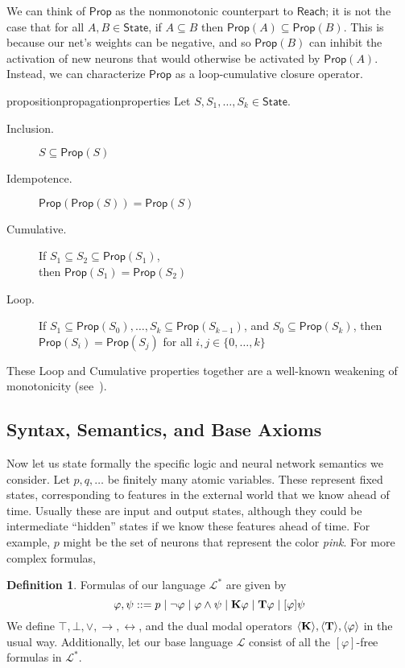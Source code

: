 \documentclass[letterpaper]{article}
\theoremstyle{definition}
\newtheorem{definition}{Definition}
\newcommand{\State}{\mathsf{State}}
\newcommand{\lang}{\mathcal{L}}
\newcommand{\uplang}{\mathcal{L}^\ast}
\newcommand{\set}[1]{\{ #1 \}}
\newcommand{\Prop}{\mathsf{Prop}}
\newcommand{\Reach}{\mathsf{Reach}}
\newcommand{\Typ}[1]{\textrm{\textup{\textbf{T}}} #1}
\newcommand{\Know}[1]{\textrm{\textup{\textbf{K}}} #1}
\newcommand{\Hebbop}[1]{[#1]}
\newcommand{\diaTyp}[1]{\langle \textrm{\textup{\textbf{T}}} \rangle #1}
\newcommand{\diaKnow}[1]{\langle \textrm{\textup{\textbf{K}}} \rangle #1}
\newcommand{\diaHebbop}[1]{\langle #1\rangle}
\begin{document}
We can think of $\Prop$ as the nonmonotonic counterpart to $\Reach$; it is not the case that for all $A, B \in \State$, if $A \subseteq B$ then $\Prop(A) \subseteq \Prop(B)$.  This is because our net's weights can be negative, and so $\Prop(B)$ can inhibit the activation of new neurons that would otherwise be activated by $\Prop(A)$.  Instead, we can characterize $\Prop$ as a loop-cumulative closure operator.
\begin{restatable}{proposition}{propagationproperties}\cite{leitgeb2001nonmonotonic}\label{propagation-properties}
    Let $S, S_1, \ldots, S_k \in \State$.
    \begin{description}
        \item[Inclusion.] $S \subseteq \Prop(S)$
        \item[Idempotence.] $\Prop(\Prop(S)) = \Prop(S)$
        \item[Cumulative.] If $S_1 \subseteq S_2 \subseteq \Prop(S_1)$,\\ then $\Prop(S_1) = \Prop(S_2)$
        \item[Loop.] If $S_1 \subseteq \Prop(S_0), \ldots, S_k \subseteq \Prop(S_{k-1})$, and $S_0 \subseteq \Prop(S_k)$, then $\Prop(S_i) = \Prop(S_j)$ for all $i, j \in \set{0, \ldots, k}$
    \end{description}
\end{restatable}
These Loop and Cumulative properties together are a well-known weakening of monotonicity (see~\cite{kraus1990nonmonotonic}).

\subsection{Syntax, Semantics, and Base Axioms}

Now let us state formally the specific logic and neural network semantics we consider.  Let $p, q, \ldots$ be finitely many atomic variables. These represent fixed states, corresponding to features in the external world that we know ahead of time.  Usually these are input and output states, although they could be intermediate ``hidden'' states if we know these features ahead of time.  For example, $p$ might be the set of neurons that represent the color \emph{pink}.  For more complex formulas,
\begin{definition}
    Formulas of our language $\uplang$ are given by
    \[
        \varphi, \psi ::= p \mid \neg \varphi \mid \varphi \land \psi \mid \Know{\varphi} \mid \Typ{\varphi} \mid \Hebbop{\varphi} \psi
    \]
    We define $\top, \bot, \lor, \to, \leftrightarrow$, and the dual modal operators $\diaKnow, \diaTyp, \diaHebbop{\varphi}$ in the usual way.  Additionally, let our base language $\lang$ consist of all the $\Hebbop{\varphi}$-free formulas in $\uplang$.
\end{definition}
\end{document}
